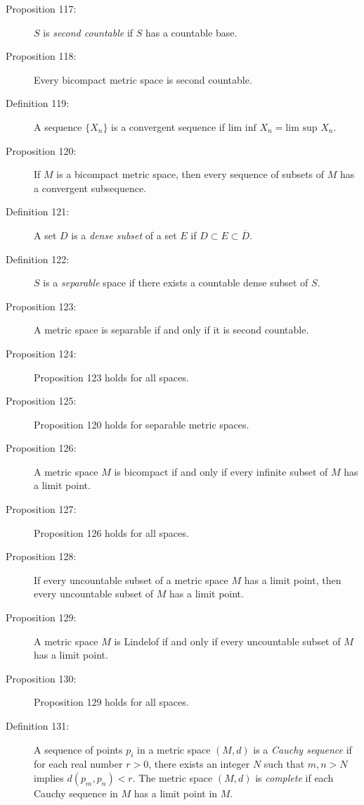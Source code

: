 \documentclass{article}
\begin{document}
\begin{description}
  \item[Proposition 117:] $S$ is \emph{second countable} if $S$ has a countable base.

  \item[Proposition 118:] Every bicompact metric space is second countable.

  \item[Definition 119:] A sequence $\{ X_n \}$ is a convergent sequence if $\text{lim } \text{inf } X_n = \text{lim } \text{sup } X_n$.

  \item[Proposition 120:] If $M$ is a bicompact metric space, then every sequence of subsets of $M$ has a convergent subsequence.

  \item[Definition 121:] A set $D$ is a \emph{dense subset} of a set $E$ if $D \subset E \subset \overline{D}$.

  \item[Definition 122:] $S$ is a \emph{separable} space if there exists a countable dense subset of $S$.

  \item[Proposition 123:] A metric space is separable if and only if it is second countable.

  \item[Proposition 124:] Proposition 123 holds for all spaces.

  \item[Proposition 125:] Proposition 120 holds for separable metric spaces.

  \item[Proposition 126:] A metric space $M$ is bicompact if and only if every infinite subset of $M$ has a limit point.

  \item[Proposition 127:] Proposition 126 holds for all spaces.

  \item[Proposition 128:] If every uncountable subset of a metric space $M$ has a limit point, then every uncountable subset of $M$ has a limit point.

  \item[Proposition 129:] A metric space $M$ is Lindelof if and only if every uncountable subset of $M$ has a limit point.

  \item[Proposition 130:] Proposition 129 holds for all spaces.

  \item[Definition 131:] A sequence of points $p_i$ in a metric space $(M,d)$ is a \emph{Cauchy sequence} if for each real number $r>0$, there exists an integer $N$ such that $m,n > N$ implies $d(p_m, p_n) < r$. The metric space $(M,d)$ is \emph{complete} if each Cauchy sequence in $M$ has a limit point in $M$.


\end{description}
\end{document}
